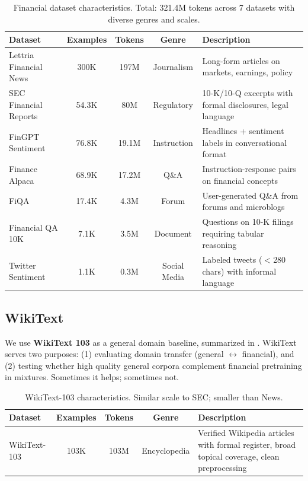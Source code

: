 \begin{table}[h]
\centering
\caption[Financial Dataset Characteristics]{Financial dataset characteristics. Total: 321.4M tokens across 7 datasets with diverse genres and scales.}
\label{tab:financial_datasets}
\small
\begin{tabular}{p{3cm}cccp{5.5cm}}
\toprule
\textbf{Dataset} & \textbf{Examples} & \textbf{Tokens} & \textbf{Genre} & \textbf{Description} \\
\midrule
Lettria Financial News & 300K & 197M & Journalism & Long-form articles on markets, earnings, policy \\
\midrule
SEC Financial Reports & 54.3K & 80M & Regulatory & 10-K/10-Q excerpts with formal disclosures, legal language \\
\midrule
FinGPT Sentiment & 76.8K & 19.1M & Instruction & Headlines + sentiment labels in conversational format \\
\midrule
Finance Alpaca & 68.9K & 17.2M & Q\&A & Instruction-response pairs on financial concepts \\
\midrule
FiQA & 17.4K & 4.3M & Forum & User-generated Q\&A from forums and microblogs \\
\midrule
Financial QA 10K & 7.1K & 3.5M & Document & Questions on 10-K filings requiring tabular reasoning \\
\midrule
Twitter Sentiment & 1.1K & 0.3M & Social Media & Labeled tweets ($<$280 chars) with informal language \\
\bottomrule
\end{tabular}
\end{table}

\subsection{WikiText}

We use \textbf{WikiText 103} \parencite{merity2016pointer} as a general domain baseline, summarized in . WikiText serves two purposes: (1) evaluating domain transfer (general $\leftrightarrow$ financial), and (2) testing whether high quality general corpora complement financial pretraining in mixtures. Sometimes it helps; sometimes not.

\begin{table}[h]
\centering
\caption[WikiText Dataset Characteristics]{WikiText-103 characteristics. Similar scale to SEC; smaller than News.}
\label{tab:wikitext_dataset}
\small
\begin{tabular}{p{3cm}cccp{5.5cm}}
\toprule
\textbf{Dataset} & \textbf{Examples} & \textbf{Tokens} & \textbf{Genre} & \textbf{Description} \\
\midrule
WikiText-103 & 103K & 103M & Encyclopedia & Verified Wikipedia articles with formal register, broad topical coverage, clean preprocessing \\
\bottomrule
\end{tabular}
\end{table}

